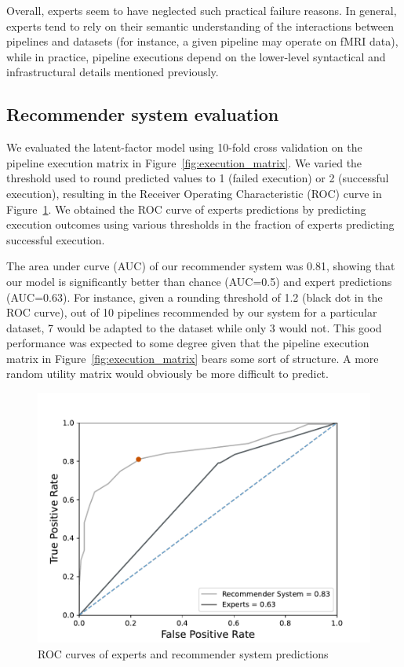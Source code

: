 \documentclass[conference]{IEEEtran}
\begin{document}
Overall, experts seem to have neglected such practical failure reasons. In
general, experts tend to rely on their semantic understanding of the
interactions between pipelines and datasets (for instance, a given pipeline
may operate on fMRI data), while in practice, pipeline executions depend on
the lower-level syntactical and infrastructural details mentioned previously.




\subsection{Recommender system evaluation} 

We evaluated the latent-factor model using 10-fold cross validation on the
pipeline execution matrix in Figure~\ref{fig:execution_matrix}. We varied
the threshold used to round predicted values to 1 (failed execution) or 2
(successful execution), resulting in the Receiver Operating Characteristic
(ROC) curve  in Figure~\ref{fig:roc-curve}. We obtained the ROC curve of
experts predictions by predicting execution outcomes using various
thresholds in the fraction of experts predicting successful execution. 

The area under curve (AUC) of our recommender system was 0.81, showing that
our model is significantly better than chance (AUC=0.5) and expert
predictions (AUC=0.63). For instance, given a rounding threshold of 1.2
(black dot in the ROC curve), out of 10 pipelines
recommended by our system for a particular dataset, 7 would be adapted to
the dataset while only 3 would not. This good performance was expected to some degree given that the pipeline execution matrix in
Figure~\ref{fig:execution_matrix} bears some sort of structure. 
A more random utility matrix would obviously be more difficult to predict.

\begin{figure}
\centering
  \includegraphics[width=\columnwidth]{figures/ROC Curve.pdf}
  \caption{ROC curves of experts and recommender system predictions}
  \label{fig:roc-curve}
\end{figure}
\end{document}
